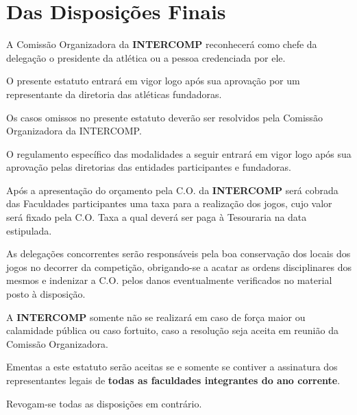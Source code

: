{\let\clearpage\relax \chapter{Das Disposições Finais}}

\begin{article}
	A Comissão Organizadora da \textbf{INTERCOMP} reconhecerá como chefe da delegação o presidente da atlética ou a pessoa credenciada por ele.
\end{article}

\begin{article}
	O presente estatuto entrará em vigor logo após sua aprovação por um representante da diretoria das atléticas fundadoras.
\end{article}

\begin{article}
	Os casos omissos no presente estatuto deverão ser resolvidos pela Comissão Organizadora da INTERCOMP.
\end{article}

\begin{article}
	O regulamento específico das modalidades a seguir entrará em vigor logo após sua aprovação pelas diretorias das entidades participantes e fundadoras.
\end{article}

\begin{article}
	Após a apresentação do orçamento pela C.O. da \textbf{INTERCOMP} será cobrada das Faculdades participantes uma taxa para a realização dos jogos, cujo valor será fixado pela C.O. Taxa a qual deverá ser paga à Tesouraria na data estipulada.
\end{article}

\begin{article}
	As delegações concorrentes serão responsáveis pela boa conservação dos locais dos jogos no decorrer da competição, obrigando-se a acatar as ordens disciplinares dos mesmos e indenizar a C.O. pelos danos eventualmente verificados no material posto à disposição.
\end{article}

\begin{article}
	A \textbf{INTERCOMP} somente não se realizará em caso de força maior ou calamidade pública ou caso fortuito, caso a resolução seja aceita em reunião da Comissão Organizadora.
\end{article}

\begin{article}
	Ementas a este estatuto serão aceitas se e somente se contiver a assinatura dos representantes legais de \textbf{todas as faculdades integrantes do ano corrente}.
\end{article}

\begin{article}
	Revogam-se todas as disposições em contrário.
\end{article}
